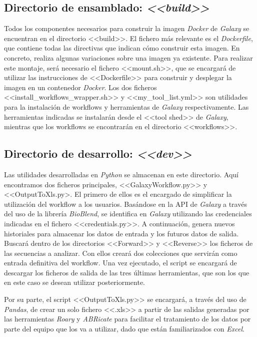 \subsection{Directorio de ensamblado: \textit{<<build>>}}
Todos los componentes necesarios para construir la imagen \textit{Docker} de \textit{Galaxy} se encuentran en el directorio <<build>>. El fichero más relevante es el \textit{Dockerfile}, que contiene todas las directivas que indican cómo construir esta imagen. En concreto, realiza algunas variaciones sobre una imagen ya existente. Para realizar este montaje, será necesario el fichero <<mount.sh>>, que se encargará de utilizar las instrucciones de <<Dockerfile>> para construir y desplegar la imagen en un contenedor \textit{Docker}. Los dos ficheros <<install\_workflows\_wrapper.sh>> y <<my\_tool\_list.yml>> son utilidades para la instalación de workflows y herramientas de \textit{Galaxy} respectivamente. Las herramientas indicadas se instalarán desde el <<tool shed>> de \textit{Galaxy}, mientras que los workflows se encontrarán en el directorio <<workflows>>.

\subsection{Directorio de desarrollo: \textit{<<dev>>}}
Las utilidades desarrolladas en \textit{Python} se almacenan en este directorio. Aquí encontramos dos ficheros principales, <<GalaxyWorkflow.py>> y <<OutputToXls.py>. El primero de ellos es el encargado de simplificar la utilización del workflow a los usuarios. Basándose en la API de \textit{Galaxy} a través del uso de la librería \textit{BioBlend}, se identifica en \textit{Galaxy} utilizando las credenciales indicadas en el fichero <<credentials.py>>. A continuación, genera nuevos historiales para almacenar los datos de entrada y los futuros datos de salida. Buscará dentro de los directorios <<Forward>> y <<Reverse>> los ficheros de las secuencias a analizar. Con ellos creará dos colecciones que servirán como entrada definitiva del workflow. Una vez ejecutado, el script se encargará de descargar los ficheros de salida de las tres últimas herramientas, que son los que en este caso se desean utilizar posteriormente.

Por su parte, el script <<OutputToXls.py>> se encargará, a través del uso de \textit{Pandas}, de crear un solo fichero <<.xls>> a partir de las salidas generadas por las herramientas \textit{Roary} y \textit{ABRicate} para facilitar el tratamiento de los datos por parte del equipo que los va a utilizar, dado que están familiarizados con \textit{Excel}.

